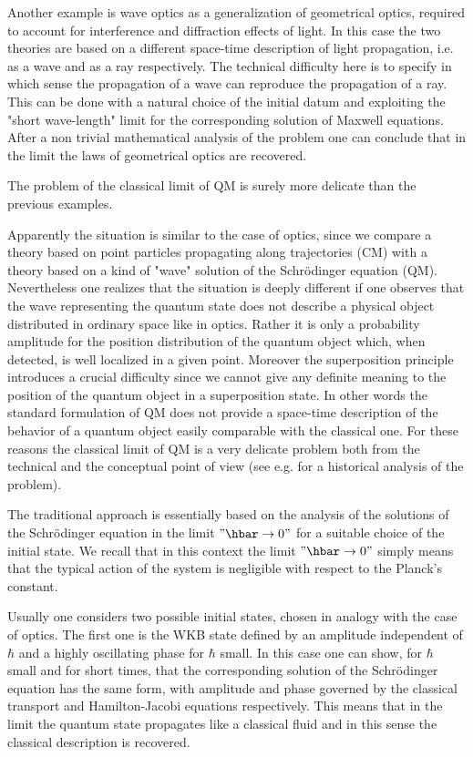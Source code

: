 \documentclass[12pt,reqno]{amsart}
\newcommand{\n}{\relax}
\numberwithin{equation}{section}
\begin{document}
\n
Another example is  wave optics as a generalization of  geometrical optics, required to account for interference and diffraction effects of light. In this case  the two theories are based on a different space-time description of  light propagation, i.e. as a wave and as a ray respectively. The technical difficulty here is to specify in which sense the propagation of a wave  can reproduce the propagation of a ray. This can be done with a natural choice of the initial datum and  exploiting the "short wave-length"  limit  for the corresponding solution of  Maxwell  equations. After a  non trivial  mathematical analysis of the problem one can conclude that in the limit   the laws of geometrical optics are recovered.

\n
The problem of the classical limit of QM is surely more delicate than the previous examples. 

\n
Apparently the situation is similar to the case of optics, since we compare a theory based on point particles propagating along  trajectories (CM) with a theory based on a kind of "wave" solution of the Schr\"{o}dinger equation (QM). Nevertheless one realizes that the situation is deeply different  if one observes that the wave representing the quantum state does not describe a physical object distributed in ordinary space like in optics. Rather it is only a probability amplitude for the position distribution of the quantum object which, when detected, is well localized in a given point. Moreover the 
superposition principle introduces a crucial  difficulty since we cannot give any definite meaning to the position of the quantum object in a superposition state.  In other words the standard formulation of QM does not provide a  space-time description of the behavior of a quantum object easily  comparable with the classical one. For these reasons the classical limit of QM is a very delicate problem both from the technical and  the conceptual point of view (see e.g. \cite{ck} for a historical analysis of the problem).


\n
The traditional approach is essentially based on the analysis of the solutions of the Schr\"{o}dinger equation in the limit  $"\hbar \rightarrow 0"$ for  a suitable choice of the initial state.   We recall that in this context the limit $"\hbar \rightarrow 0"$ simply means that the typical action of the system is negligible with respect to the Planck's constant.



\n
Usually one considers two possible initial states, chosen in analogy  with the case of optics. The first one  is the WKB state defined by an   amplitude independent of $\hbar$  and a highly oscillating phase for $\hbar$ small. In this case one can show, for $\hbar $ small and for short times, that the corresponding solution of the Schr\"{o}dinger equation has the same form, with amplitude and phase governed by the classical transport and Hamilton-Jacobi equations respectively. This means that in the limit the quantum state propagates like a classical fluid and in this sense the classical description is recovered. 
\end{document}
